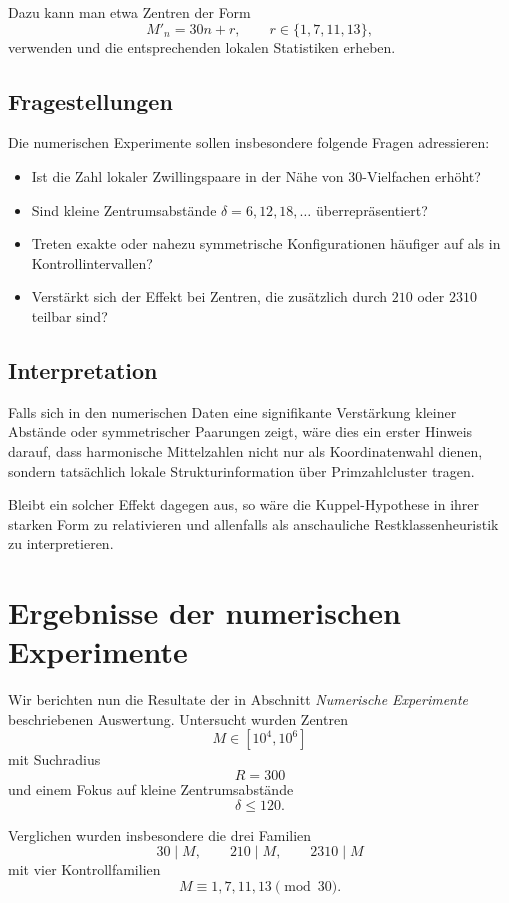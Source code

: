 \documentclass[11pt,a4paper]{article}
\theoremstyle{definition}
\theoremstyle{plain}
\theoremstyle{remark}
\begin{document}
	Dazu kann man etwa Zentren der Form
	\[
	M'_n = 30n + r,\qquad r\in\{1,7,11,13\},
	\]
	verwenden und die entsprechenden lokalen Statistiken erheben.
	
	\subsection{Fragestellungen}
	
	Die numerischen Experimente sollen insbesondere folgende Fragen adressieren:
	
	\begin{itemize}[leftmargin=1.5em]
		\item Ist die Zahl lokaler Zwillingspaare in der Nähe von $30$-Vielfachen erhöht?
		\item Sind kleine Zentrumsabstände $\delta=6,12,18,\dots$ überrepräsentiert?
		\item Treten exakte oder nahezu symmetrische Konfigurationen häufiger auf als in Kontrollintervallen?
		\item Verstärkt sich der Effekt bei Zentren, die zusätzlich durch $210$ oder $2310$ teilbar sind?
	\end{itemize}
	
	\subsection{Interpretation}
	
	Falls sich in den numerischen Daten eine signifikante Verstärkung kleiner Abstände oder symmetrischer Paarungen zeigt, wäre dies ein erster Hinweis darauf, dass harmonische Mittelzahlen nicht nur als Koordinatenwahl dienen, sondern tatsächlich lokale Strukturinformation über Primzahlcluster tragen.
	
	Bleibt ein solcher Effekt dagegen aus, so wäre die Kuppel-Hypothese in ihrer starken Form zu relativieren und allenfalls als anschauliche Restklassenheuristik zu interpretieren.
	
	\section{Ergebnisse der numerischen Experimente}
	
	Wir berichten nun die Resultate der in Abschnitt \emph{Numerische Experimente} beschriebenen Auswertung. 
	Untersucht wurden Zentren
	\[
	M\in [10^4,10^6]
	\]
	mit Suchradius
	\[
	R=300
	\]
	und einem Fokus auf kleine Zentrumsabstände
	\[
	\delta\le 120.
	\]
	
	Verglichen wurden insbesondere die drei Familien
	\[
	30\mid M,\qquad 210\mid M,\qquad 2310\mid M
	\]
	mit vier Kontrollfamilien
	\[
	M\equiv 1,7,11,13 \pmod{30}.
	\]
	
\end{document}
